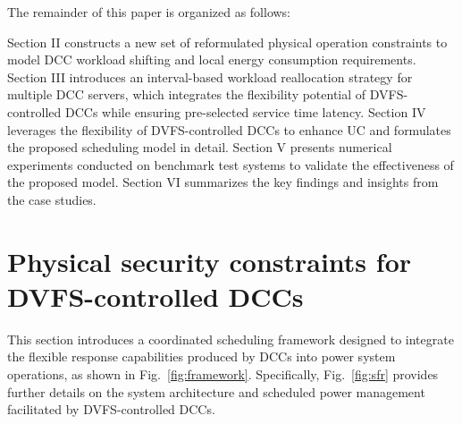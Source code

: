 \documentclass[lettersize,journal]{IEEEtran}
\begin{document}
The remainder of this paper is organized as follows:

Section II constructs a new set of reformulated physical operation constraints to model DCC workload shifting and local energy consumption requirements.
Section III introduces an interval-based workload reallocation strategy for multiple DCC servers, which integrates the flexibility potential of DVFS-controlled DCCs while ensuring pre-selected service time latency.
Section IV leverages the flexibility of DVFS-controlled DCCs to enhance UC and formulates the proposed scheduling model in detail.
Section V presents numerical experiments conducted on benchmark test systems to validate the effectiveness of the proposed model.
Section VI summarizes the key findings and insights from the case studies.

\section{Physical security constraints for DVFS-controlled DCCs}


This section introduces a coordinated scheduling framework designed to integrate the flexible response capabilities produced by DCCs into power system operations, as shown in Fig.~\ref{fig:framework}. Specifically, Fig.~\ref{fig:sfr} provides further details on the system architecture and scheduled power management facilitated by DVFS-controlled DCCs.
\end{document}
